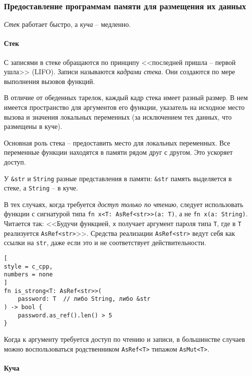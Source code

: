 \documentclass[%
	11pt,
	a4paper,
	utf8,
		]{article}
\begin{document}
\subsubsection{Предоставление программам памяти для размещения их данных}

{\color{blue}\emph{Стек} работает быстро, а \emph{куча} -- медленно.}

\paragraph{Стек}

С записями в стеке обращаются по принципу <<последней пришла -- первой ушла>> (LIFO). Записи называются \emph{кадрами стека}. Они создаются по мере выполнения вызовов функций.

В отличие от обеденных тарелок, каждый кадр стека имеет разный размер. В нем имеется пространство для аргументов его функции, указатель на исходное место вызова и значения локальных переменных (за исключением тех данных, что размещены в куче). 

Основная роль стека -- предоставить место для локальных переменных. Все переменные функции находятся в памяти рядом друг с другом. Это ускоряет доступ.

У \verb|&str| и \verb|String| разные представления в памяти: \verb|&str| память выделяется в стеке, а \verb|String| -- в куче.

В тех случаях, когда требуется \emph{доступ только по чтению}, следует использовать функции с сигнатурой типа \verb|fn x<T: AsRef<str>>(a: T)|, а не \verb|fn x(a: String)|. Читается так: <<Будучи функцией, \verb|x| получает аргумент пароля типа \verb|T|, где в \verb|T| реализуется \verb|AsRef<str>|>>. Средства реализации \verb|AsRef<str>| ведут себя как ссылки на \verb|str|, даже если это и не соответствует действительности.
\begin{lstlisting}[
style = c_cpp,
numbers = none
]
fn is_strong<T: AsRef<str>>(
    password: T  // либо String, либо &str
) -> bool {
    password.as_ref().len() > 5
}
\end{lstlisting}

Когда к аргументу требуется доступ по чтению и записи, в большинстве случаев можно воспользоваться родственником \verb|AsRef<T>| типажом \verb|AsMut<T>|. 


\paragraph{Куча}
\end{document}
